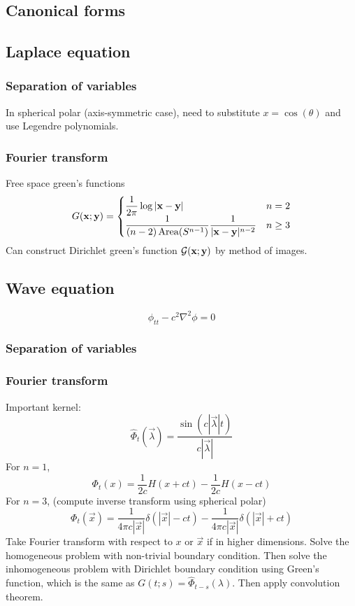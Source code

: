\documentclass{article}
\theoremstyle{definition}
\theoremstyle{remark}
\theoremstyle{plain}
\theoremstyle{definition}
\begin{document}
\subsection{Canonical forms}

\subsection{Laplace equation}
\subsubsection{Separation of variables}
In spherical polar (axis-symmetric case), need to substitute $x=\cos(\theta)$ and use Legendre polynomials.
\subsubsection{Fourier transform}
Free space green's functions
\begin{align*}
    G({\bf x};{\bf y})=\begin{cases}
        \dfrac{1}{2\pi}\log\vert{\bf x}-{\bf y}\vert & n=2\\
        \dfrac{1}{(n-2)\operatorname{Area}(S^{n-1})}\dfrac{1}{\vert{\bf x}-{\bf y}\vert^{n-2}} & n\ge 3
    \end{cases}
\end{align*}
Can construct Dirichlet green's function $\mathcal{G}({\bf x};{\bf y})$ by method of images.
\subsection{Wave equation}
\[\phi_{tt}-c^2\nabla^2\phi=0\]
\subsubsection{Separation of variables}
\subsubsection{Fourier transform}
Important kernel:
\[\hat\Phi_t(\vec\lambda)=\dfrac{\sin(c|\vec\lambda|t)}{c|\vec\lambda|}\]
For $n=1$,
\[\Phi_t(x)=\dfrac{1}{2c}H(x+ct)-\dfrac{1}{2c}H(x-ct)\]
For $n=3$, (compute inverse transform using spherical polar)
\[\Phi_t(\vec x)=\dfrac{1}{4\pi c|\vec x|}\delta(|\vec x|-ct)-\dfrac{1}{4\pi c|\vec x|}\delta(|\vec x|+ct)\]
Take Fourier transform with respect to $x$ or $\vec x$ if in higher dimensions. Solve the homogeneous problem with non-trivial boundary condition. Then solve the inhomogeneous problem with Dirichlet boundary condition using Green's function, which is the same as $G(t;s)=\hat\Phi_{t-s}(\lambda)$. Then apply convolution theorem.
\end{document}
